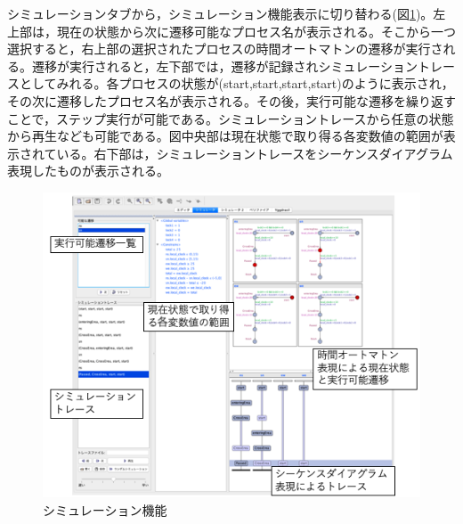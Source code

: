 \documentclass{tpu-sotu}
\begin{document}
	シミュレーションタブから，シミュレーション機能表示に切り替わる(図\ref{ESR})。左上部は，現在の状態から次に遷移可能なプロセス名が表示される。そこから一つ選択すると，右上部の選択されたプロセスの時間オートマトンの遷移が実行される。遷移が実行されると，左下部では，遷移が記録されシミュレーショントレースとしてみれる。各プロセスの状態が(start,start,start,start)のように表示され，その次に遷移したプロセス名が表示される。その後，実行可能な遷移を繰り返すことで，ステップ実行が可能である。シミュレーショントレースから任意の状態から再生なども可能である。図中央部は現在状態で取り得る各変数値の範囲が表示されている。右下部は，シミュレーショントレースをシーケンスダイアグラム表現したものが表示される。
	\begin{figure}[htbp]
	\centering
	\includegraphics[width=140mm]{ExmpleSimulationResult.png}
	\caption{シミュレーション機能}
	\label{ESR}   
	\end{figure}
\end{document}
